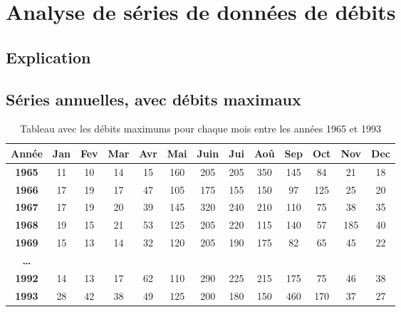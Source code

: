 \chapter{Analyse de séries de données de débits}

\section{Explication}

\section{Séries annuelles, avec débits maximaux}

\begin{table}[H]
    \centering
    \begin{tabular}{|c||c|c|c|c|c|c|c|c|c|c|c|c|}
        \hline
        \textbf{Année} & \textbf{Jan} & \textbf{Fev} & \textbf{Mar} & \textbf{Avr} & \textbf{Mai} & \textbf{Juin} & \textbf{Jui} & \textbf{Aoû} & \textbf{Sep} & \textbf{Oct} & \textbf{Nov} & \textbf{Dec} \\
        \hline \hline
        \textbf{1965}  & 11 & 10 & 14 & 15 & 160 & 205 & 205 & \cellcolor{red}350 & 145 &  84 &  21 & 18 \\
        \hline
        \textbf{1966}  & 17 & 19 & 17 & 47 & 105 & \cellcolor{red}175 & 155 & 150 &  97 & 125 &  25 & 20 \\
        \hline
        \textbf{1967}  & 17 & 19 & 20 & 39 & 145 & \cellcolor{red}320 & 240 & 210 & 110 &  75 &  38 & 35 \\
        \hline
        \textbf{1968}  & 19 & 15 & 21 & 53 & 125 & 205 & \cellcolor{red}220 & 115 & 140 &  57 & 185 & 40 \\
        \hline
        \textbf{1969}  & 15 & 13 & 14 & 32 & 120 & \cellcolor{red}205 & 190 & 175 &  82 &  65 &  45 & 22 \\
        \hline
        \textbf{\dots} &    &    &    &    &     &     &     &     &       &     &     &      \\
        \hline
        \textbf{1992}  & 14 & 13 & 17 & 62 & 110 & \cellcolor{red}290 & 225 & 215 & 175 &  75 &  46 & 38 \\
        \hline
        \textbf{1993}  & 28 & 42 & 38 & 49 & 125 & 200 & 180 & 150 & \cellcolor{red}460 & 170 &  37 & 27 \\
        \hline
    \end{tabular}
    \caption{Tableau avec les débits maximums pour chaque mois entre les années 1965 et 1993}
    \label{tab:serieAnnuelleMaximum}
\end{table}

